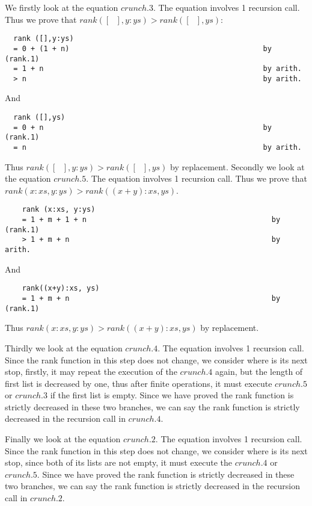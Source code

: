 \documentclass[11pt]{article}
\theoremstyle{definition}
\begin{document}
\begin{enumerate}
\begin{enumerate}
  We firstly look at the equation $crunch.3$. The equation involves 1 recursion call. Thus we prove that 
  $rank([\text{ }],y:ys) > rank([\text{ }], ys)$:
  \begin{verbatim}
  rank ([],y:ys)
  = 0 + (1 + n)                                             by (rank.1)
  = 1 + n                                                   by arith.
  > n                                                       by arith.
  \end{verbatim}
  And
  \begin{verbatim}
  rank ([],ys)
  = 0 + n                                                   by (rank.1)
  = n                                                       by arith.
  \end{verbatim}
  Thus $rank([\text{ }],y:ys) > rank([\text{ }], ys)$ by replacement.
  Secondly we look at the equation $crunch.5$. The equation involves 1 recursion call. Thus we prove that
  $rank(x:xs, y:ys) > rank((x+y):xs, ys)$.
  \begin{verbatim}
    rank (x:xs, y:ys)
    = 1 + m + 1 + n                                           by (rank.1)
    > 1 + m + n                                               by arith.
  \end{verbatim}
  And
  \begin{verbatim}
    rank((x+y):xs, ys)
    = 1 + m + n                                               by (rank.1)
  \end{verbatim}
  Thus $rank(x:xs, y:ys) > rank((x+y):xs, ys)$ by replacement.

  Thirdly we look at the equation $crunch.4$. The equation involves 1 recursion call. Since the rank function in this step
  does not change, we consider where is its next stop, firstly, it may repeat the execution of the $crunch.4$ again, but the length
  of first list is decreased by one, thus after finite operations, it must execute $crunch.5$ or $crunch.3$ if the first
  list is empty. Since we have proved the rank function is strictly decreased in these two branches, we can say the rank 
  function is strictly decreased in the recursion call in $crunch.4$.

  Finally we look at the equation $crunch.2$. The equation involves 1 recursion call. Since the rank function in this step
  does not change, we consider where is its next stop, since both of its lists are not empty, it must execute the 
  $crunch.4$ or $crunch.5$. Since we have proved the rank function is strictly decreased in these two branches, we can say
  the rank function is strictly decreased in the recursion call in $crunch.2$.


\end{enumerate}
\end{enumerate}
\end{document}
